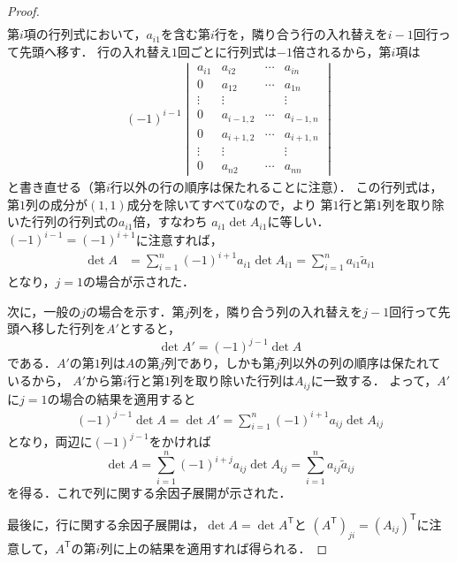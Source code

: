 \begin{tleftbar}
\begin{proof}
\begin{align*}
\end{align*}
第$i$項の行列式において，$a_{i1}$を含む第$i$行を，隣り合う行の入れ替えを$i-1$回行って先頭へ移す．
行の入れ替え$1$回ごとに行列式は$-1$倍されるから，第$i$項は
\begin{align*}
  (-1)^{i-1}
  \begin{vmatrix}
    a_{i1} & a_{i2}     & \cdots & a_{in} \\
    0      & a_{12}     & \cdots & a_{1n} \\
    \vdots & \vdots     &        & \vdots \\
    0      & a_{i-1,2}  & \cdots & a_{i-1,n} \\
    0      & a_{i+1,2}  & \cdots & a_{i+1,n} \\
    \vdots & \vdots     &        & \vdots \\
    0      & a_{n2}     & \cdots & a_{nn}
  \end{vmatrix}
\end{align*}
と書き直せる（第$i$行以外の行の順序は保たれることに注意）．
この行列式は，第$1$列の成分が$(1,1)$成分を除いてすべて$0$なので，より
第$1$行と第$1$列を取り除いた行列の行列式の$a_{i1}$倍，すなわち
$a_{i1}\det A_{i1}$に等しい．$(-1)^{i-1} = (-1)^{i+1}$に注意すれば，
\begin{align*}
  \det A
  &= \sum_{i=1}^{n} (-1)^{i+1} a_{i1} \det A_{i1}
   = \sum_{i=1}^{n} a_{i1} \tilde{a}_{i1}
\end{align*}
となり，$j=1$の場合が示された．

次に，一般の$j$の場合を示す．第$j$列を，隣り合う列の入れ替えを$j-1$回行って先頭へ移した行列を$A'$とすると，
\[
  \det A' = (-1)^{j-1} \det A
\]
である．$A'$の第$1$列は$A$の第$j$列であり，しかも第$j$列以外の列の順序は保たれているから，
$A'$から第$i$行と第$1$列を取り除いた行列は$A_{ij}$に一致する．
よって，$A'$に$j=1$の場合の結果を適用すると
\begin{align*}
  (-1)^{j-1} \det A = \det A'
  = \sum_{i=1}^{n} (-1)^{i+1} a_{ij} \det A_{ij}
\end{align*}
となり，両辺に$(-1)^{j-1}$をかければ
\[
  \det A = \sum_{i=1}^{n} (-1)^{i+j} a_{ij} \det A_{ij}
         = \sum_{i=1}^{n} a_{ij} \tilde{a}_{ij}
\]
を得る．これで列に関する余因子展開が示された．

最後に，行に関する余因子展開は，$\det A = \det A^\mathsf{T}$と
$(A^\mathsf{T})_{ji} = (A_{ij})^\mathsf{T}$に注意して，$A^\mathsf{T}$の第$i$列に上の結果を適用すれば得られる．
\end{proof}
\end{tleftbar}

